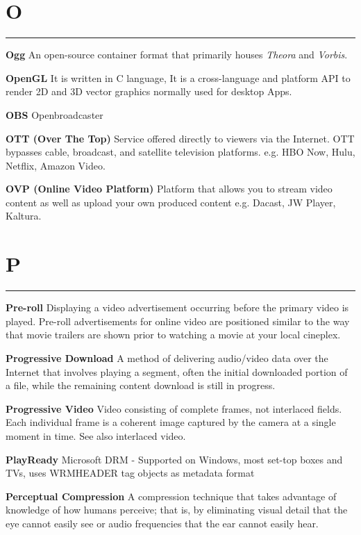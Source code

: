 \section{O}
\hrule

\medskip
\textbf{Ogg}
An open-source container format that primarily houses \textit{Theora} and \textit{Vorbis}.

\smallskip
\textbf{OpenGL}
It is written in C language, It is a cross-language and platform API to render 2D and 3D vector graphics normally used for desktop Apps.

\smallskip
\textbf{OBS}
Openbroadcaster

\smallskip
\textbf{OTT (Over The Top)}
Service offered directly to viewers via the Internet. OTT bypasses cable, broadcast, and satellite television platforms. e.g. HBO Now, Hulu, Netflix, Amazon Video.

\smallskip
\textbf{OVP (Online Video Platform)}
Platform that allows you to stream video content as well as upload your own produced content e.g. Dacast, JW Player, Kaltura.


\section{P}
\hrule



\medskip
\textbf{Pre-roll}
Displaying a video advertisement occurring before the primary video is played. Pre-roll advertisements for online video are positioned similar to the way that movie trailers are shown prior to watching a movie at your local cineplex.


\smallskip
\textbf{Progressive Download}
A method of delivering audio/video data over the Internet that involves playing a segment, often the initial downloaded portion of a file, while the remaining content download is still in progress.

\smallskip
\textbf{Progressive Video}
Video consisting of complete frames, not interlaced fields. Each individual frame is a coherent image captured by the camera at a single moment in time. See also interlaced video.

\smallskip
\textbf{PlayReady}
Microsoft DRM - Supported on Windows, most set-top boxes and TVs, uses WRMHEADER tag objects as metadata format

\smallskip
\textbf{Perceptual Compression}
A compression technique that takes advantage of knowledge of how humans perceive; that is, by eliminating visual detail that the eye cannot easily see or audio frequencies that the ear cannot easily hear.

